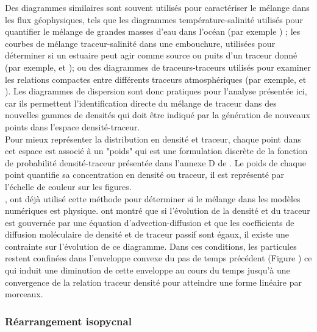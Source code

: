 \documentclass[a4paper,12pt]{article}
\begin{document}
        Des diagrammes similaires sont souvent utilisés pour caractériser le mélange dans les flux géophysiques, tels que les diagrammes température-salinité utilisés pour quantifier le mélange de grandes masses d'eau dans l'océan (par exemple \citep{tomczak_multi-parameter_1981}) ; les courbes de mélange traceur-salinité dans une embouchure, utilisées pour déterminer si un estuaire peut agir comme source ou puits d'un traceur donné (par exemple, \citep{loder_dynamics_1981} et \cite{officer_dynamics_1981}); ou des diagrammes de traceurs-traceurs utilisés pour examiner les relations compactes entre différents traceurs atmosphériques (par exemple, \cite{tilmes_development_2006} et \cite{plumb_tracer_2007}). Les diagrammes de dispersion sont donc pratiques pour l'analyse présentée ici, car ils permettent l'identification directe du mélange de traceur dans des nouvelles gammes de densités
        qui doit être indiqué par la génération de nouveaux points dans l'espace densité-traceur.\\
        Pour mieux représenter la distribution en densité et traceur, chaque point dans cet espace est associé à un "poids" qui est une formulation discrète de la fonction de probabilité densité-traceur présentée dans l'annexe D de \cite{plumb_tracer_2007}. Le poids de chaque point quantifie sa concentration en densité ou traceur, il est représenté par l'échelle de couleur sur les figures. \\
        \newline
        \cite{plumb_tracer_2007}, \cite{lauritzen_evaluating_2012} ont déjà utilisé cette méthode pour déterminer si le mélange dans les modèles numériques est physique. \cite{penney_diapycnal_2020} ont montré que si l'évolution de la densité et du traceur est gouvernée par une équation d'advection-diffusion et que les coefficients de diffusion moléculaire de densité et de traceur passif sont égaux, il existe une contrainte sur l'évolution de ce diagramme. Dans ces conditions, les particules restent confinées dans l'enveloppe convexe du pas de temps précédent (Figure ) ce qui induit une diminution de cette enveloppe au cours du temps jusqu'à une convergence de la relation traceur densité pour atteindre une forme linéaire par morceaux.
    
    
        \subsubsection{Réarrangement isopycnal}
        
\end{document}
